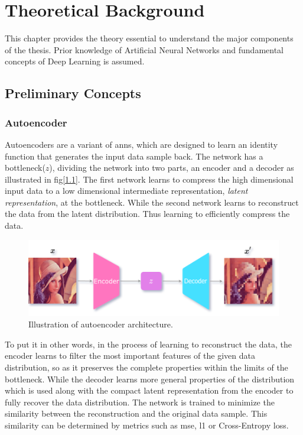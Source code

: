 \chapter{Theoretical Background}
\label{chap:background}

This chapter provides the theory essential to understand the major components of the thesis. Prior knowledge of Artificial Neural Networks \cite{theory_ann_wiki} and fundamental concepts of Deep Learning \cite{theory_dl} is assumed.

\section{Preliminary Concepts}
\label{sec:Preliminary}

\subsection{Autoencoder}
Autoencoders are a variant of \acp{ann}, which are designed to learn an identity function that generates the input data sample back. The network has a bottleneck($z$), dividing the network into two parts, an encoder and a decoder as illustrated in fig[\ref{fig:ae_arch}]. The first network learns to compress the high dimensional input data to a low dimensional intermediate representation, \textit{latent representation}, at the bottleneck. While the second network learns to reconstruct the data from the latent distribution. Thus learning to efficiently compress the data.

\begin{figure}[!h]
    \centering
    \includegraphics[scale=0.4]{figures/arch/ae_arch.png}
    \caption{Illustration of autoencoder architecture.}
    \label{fig:ae_arch}
\end{figure}

To put it in other words, in the process of learning to reconstruct the data, the encoder learns to filter the most important features of the given data distribution, so as it preserves the complete properties within the limits of the bottleneck. While the decoder learns more general properties of the distribution which is used along with the compact latent representation from the encoder to fully recover the data distribution. The network is trained to minimize the similarity between the reconstruction and the original data sample. This similarity can be determined by metrics such as \ac{mse}, \ac{l1} or Cross-Entropy loss.

